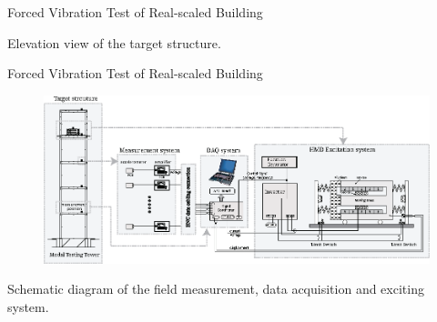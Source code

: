 \documentclass[usepdftitle=false]{beamer}
\begin{document}
\begin{frame}{Forced Vibration Test of Real-scaled Building}
\begin{figure}[!ht]
\centering
\setcounter{subfigure}{0}
\label{fig:7-1}
\end{figure}
Elevation view of the target structure.
\end{frame}

\begin{frame}{Forced Vibration Test of Real-scaled Building}
\begin{figure}[ht]
\centering
\includegraphics[width=1\textwidth] {figure/7-3.eps}
\label{fig:7-3}
\end{figure}
Schematic diagram of the field measurement, data acquisition and exciting system.
\end{frame}
\end{document}
